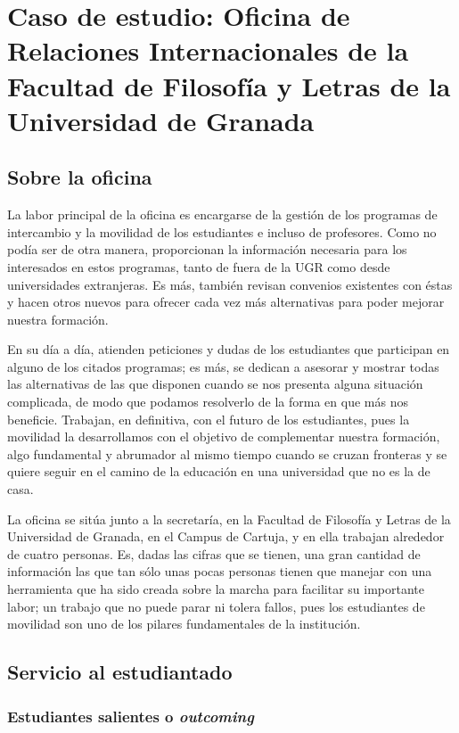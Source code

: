 \section{Caso de estudio: Oficina de Relaciones Internacionales de la Facultad de Filosofía y Letras de la Universidad de Granada}
\subsection{Sobre la oficina}
La labor principal de la oficina es encargarse de la gestión de los programas de intercambio y la movilidad de los estudiantes e incluso de profesores. Como no podía ser de otra manera, proporcionan la información necesaria para los interesados en estos programas, tanto de fuera de la UGR como desde universidades extranjeras. Es más, también revisan convenios existentes con éstas y hacen otros nuevos para ofrecer cada vez más alternativas para poder mejorar nuestra formación.

En su día a día, atienden peticiones y dudas de los estudiantes que participan en alguno de los citados programas; es más, se dedican a asesorar y mostrar todas las alternativas de las que disponen cuando se nos presenta alguna situación complicada, de modo que podamos resolverlo de la forma en que más nos beneficie. Trabajan, en definitiva, con el futuro de los estudiantes, pues la movilidad la desarrollamos con el objetivo de complementar nuestra formación, algo fundamental y abrumador al mismo tiempo cuando se cruzan fronteras y se quiere seguir en el camino de la educación en una universidad que no es la de casa.

La oficina se sitúa junto a la secretaría, en la Facultad de Filosofía y Letras de la Universidad de Granada, en el Campus de Cartuja, y en ella trabajan alrededor de cuatro personas. Es, dadas las cifras que se tienen, una gran cantidad de información las que tan sólo unas pocas personas tienen que manejar con una herramienta que ha sido creada sobre la marcha para facilitar su importante labor; un trabajo que no puede parar ni tolera fallos, pues los estudiantes de movilidad son uno de los pilares fundamentales de la institución.

\subsection{Servicio al estudiantado}
\subsubsection{Estudiantes salientes o \textit{outcoming}}

